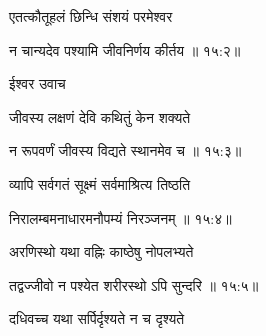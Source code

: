 {\devanagarifont एतत्कौतूहलं छिन्धि संशयं परमेश्वर \thinspace{\dandab} \dontdisplaylinenum }%


{\devanagarifont न चान्यदेव पश्यामि जीवनिर्णय कीर्तय {॥ १५:२॥} \veg\dontdisplaylinenum }%
 
{\devanagarifont ईश्वर उवाच {\dandab}\dontdisplaylinenum  }%

{\devanagarifont जीवस्य लक्षणं देवि कथितुं केन शक्यते \thinspace{\danda} \dontdisplaylinenum }%


{\devanagarifont न रूपवर्णं जीवस्य विद्यते स्थानमेव च {॥ १५:३॥} \veg\dontdisplaylinenum }%

{\devanagarifont व्यापि सर्वगतं सूक्ष्मं सर्वमाश्रित्य तिष्ठति \thinspace{\dandab} \dontdisplaylinenum }%


{\devanagarifont निरालम्बमनाधारमनौपम्यं निरञ्जनम् {॥ १५:४॥} \veg\dontdisplaylinenum }%

{\devanagarifont अरणिस्थो यथा वह्निः काष्ठेषु नोपलभ्यते \thinspace{\dandab} \dontdisplaylinenum }%
 

{\devanagarifont तद्वज्जीवो न पश्येत शरीरस्थो ऽपि सुन्दरि {॥ १५:५॥} \veg\dontdisplaylinenum }%

{\devanagarifont दधिवच्च यथा सर्पिर्दृश्यते न च दृश्यते \thinspace{\dandab} \dontdisplaylinenum }%
 
